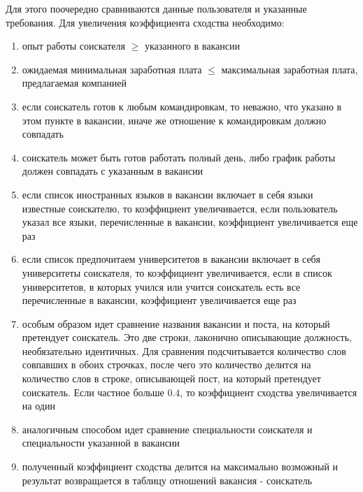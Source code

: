 Для этого поочередно сравниваются данные пользователя и указанные требования. 
Для увеличения коэффициента сходства необходимо:
\begin{enumerate}
\item опыт работы соискателя $\geqslant$  указанного в вакансии
\item ожидаемая минимальная заработная плата $\leqslant$ максимальная заработная плата, предлагаемая компанией
\item если соискатель готов к любым командировкам, то неважно, что указано в этом пункте в вакансии, иначе же отношение к командировкам должно совпадать
\item соискатель может быть готов работать полный день, либо график работы должен совпадать с указанным в вакансии
\item если список иностранных языков в вакансии включает в себя языки известные соискателю, то коэффициент увеличивается, если пользователь указал все языки, перечисленные в вакансии, коэффициент увеличивается еще раз
\item если список предпочитаем университетов в вакансии включает в себя университеты соискателя, то коэффициент увеличивается, если в список университетов, в которых учился или учится соискатель есть все перечисленные в вакансии, коэффициент увеличивается еще раз
\item особым образом идет сравнение названия вакансии и поста, на который претендует соискатель. Это две строки, лаконично описывающие должность, необязательно идентичных. Для сравнения подсчитывается количество слов совпавших в обоих строчках, после чего это количество делится на количество слов в строке, описывающей пост, на который претендует соискатель. Если частное больше $0.4$, то коэффициент сходства увеличивается на один
\item аналогичным способом идет сравнение специальности соискателя и специальности указанной в вакансии
\item полученный коэффициент сходства делится на максимально возможный и результат возвращается в таблицу отношений вакансия - соискатель
\end{enumerate} 

